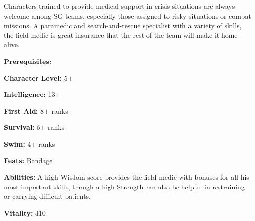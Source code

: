 \begin{multicols}{2}

Characters trained to provide medical support in crisis situations are always welcome among SG teams, especially those assigned to risky situations or combat missions. A paramedic and search-and-rescue specialist with a variety of skills, the field medic is great insurance that the rest of the team will make it home alive.

\columnbreak

\textbf{Prerequisites:} 
\begin{description*}
\item[\hspace{1.5cm}\textbf{Character Level:}] 5+
\item[\hspace{1.5cm}\textbf{Intelligence:}] 13+
\item[\hspace{1.5cm}\textbf{First Aid:}] 8+ ranks
\item[\hspace{1.5cm}\textbf{Survival:}] 6+ ranks
\item[\hspace{1.5cm}\textbf{Swim:}] 4+ ranks
\item[\hspace{1.5cm}\textbf{Feats:}] Bandage
\end{description*}

\textbf{Abilities:} A high Wisdom score provides the field medic with bonuses for all his most important skills, though a high Strength can also be helpful in restraining or carrying difficult patients.

\textbf{Vitality:} d10

\end{multicols}

\setlength{\intextsep}{-3cm}


